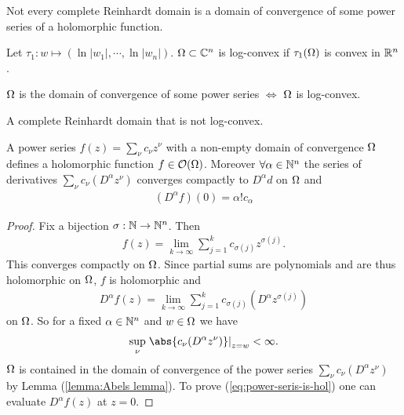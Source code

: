 \begin{remark}
    Not every complete Reinhardt domain is a domain of convergence of some power series of a holomorphic function.
\end{remark}

\begin{definition}
    Let $\tau_1 : w \mapsto (\ln |w_1| , \cdots, \ln |w_n|)$. $\Omega \subset \mathbb{C}^n$ is log-convex if $\tau_1(\Omega)$ is convex in $\mathbb{R}^n$.
\end{definition}

\begin{proposition}
    $\Omega $ is the domain of convergence of some power series $\iff$ $\Omega$ is log-convex.
\end{proposition}

\begin{example}
    A complete Reinhardt domain that is not log-convex.
\end{example}

\begin{theorem}
    A power series $f(z) = \sum_{\nu} c_{\nu} z^{\nu}$ with a non-empty domain of convergence $\Omega$ defines a holomorphic function $f \in \mathcal{O}(\Omega)$. Moreover $\forall \alpha \in \mathbb{N}^n$ the series of derivatives $\sum_\nu c_\nu (D^\alpha z^\nu)$ converges compactly to $D^\alpha d$ on $\Omega$ and
    \begin{align}\label{eq:power-seris-is-hol}
        (D^\alpha f) (0) = \alpha! c_\alpha
    \end{align}
\end{theorem}

\begin{proof}
    Fix a bijection $\sigma : \mathbb{N} \to \mathbb{N}^n$. Then
    \begin{align*}
        f(z) = \lim_{k \to \infty} \sum_{j =1}^k c_{\sigma(j)} z^{\sigma (j)}.
    \end{align*}
    This converges compactly on $\Omega$. Since partial sums are polynomials and are thus holomorphic on $\Omega$, $f$ is holomorphic and
    \begin{align*}
        D^\alpha f(z) = \lim_{k \to \infty} \sum_{j=1}^k c_{\sigma (j)} (D^\alpha z^{\sigma (j)})
    \end{align*}
    on $\Omega$. So for a fixed $\alpha \in \mathbb{N}^n$ and $w \in \Omega$ we have
    \begin{align*}
        \sup_{\nu} \left. \abs{c_\nu (D^\alpha z^\nu )} \right|_{z= w} < \infty.
    \end{align*}
    $\Omega$ is contained in the domain of convergence of the power series $\sum_\nu c_\nu (D^\alpha z^\nu)$ by Lemma (\ref{lemma:Abels lemma}). To prove (\ref{eq:power-seris-is-hol}) one can evaluate $D^\alpha f(z)$ at $z=0$.
\end{proof}

